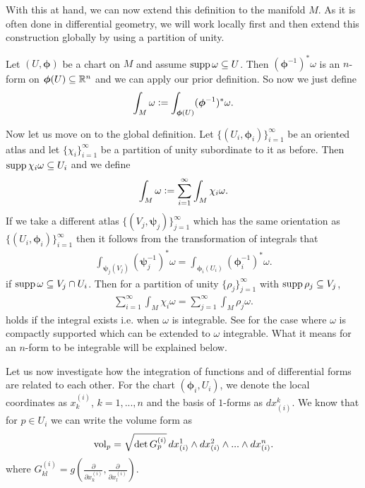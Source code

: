 \documentclass[../master_thesis.tex]{subfiles}
\begin{document}
With this at hand, we can now extend this definition to 
the manifold $M$. As it is often done in 
differential geometry, we will work locally first and then extend this 
construction globally by using a partition of unity.

Let $(U,\boldsymbol{\phi})$ be a chart on $M$ and assume $\operatorname{supp} \omega \subseteq U$. 
Then $(\boldsymbol{\phi}^{-1})^* \omega$
is an $n$-form on $\boldsymbol{\phi}(U) \subseteq \mathbb{R}^n$ and 
we can apply our prior definition. So now we just define 
\begin{align*}
    \int_M \omega \vcentcolon= \int_{\boldsymbol{\phi}(U)} (\boldsymbol{\phi}^{-1})^* \omega.
\end{align*}

Now let us move on to the global definition. Let $\{(U_i,\boldsymbol{\phi}_i)\}_{i=1}^\infty$
be an oriented atlas and let $\{ \chi_i \}_{i=1}^\infty$ be a partition 
of unity subordinate to it as before. 
Then $\operatorname{supp} \chi_i \omega \subseteq U_i$ 
and we define 
\begin{align*}
    \int_M \omega \vcentcolon= \sum_{i=1}^\infty \int_M \chi_i \omega.
\end{align*} 
If we take a different atlas $\{(V_j,\boldsymbol{\psi}_j)\}_{j=1}^\infty$
which has the same orientation as $\{(U_i,\boldsymbol{\phi}_i)\}_{i=1}^\infty$
then it follows from the transformation of integrals that 
\begin{align*}
    \int_{\boldsymbol{\psi}_j(V_j)} (\boldsymbol{\psi}_j^{-1})^* \omega
    = \int_{\boldsymbol{\phi}_i(U_i)} (\boldsymbol{\phi}_i^{-1})^* \omega.
\end{align*}
if $\operatorname{supp} \omega \subseteq V_j \cap U_i$. Then for a partition of unity 
$\{ \rho_j \}_{j=1}^\infty$ with $\operatorname{supp} \rho_j \subseteq V_j$,
\begin{align*}
    \sum_{i=1}^\infty \int_M \chi_i \omega = \sum_{j=1}^\infty \int_M \rho_j \omega.
\end{align*}
holds if the integral exists i.e. when $\omega$ is integrable. See \cite[Sec.\,V.3]{topology_and_geometry}
for the case where $\omega$ is compactly supported which can be extended 
to $\omega$ integrable.
What it means for an $n$-form to be integrable will be explained below.

Let us now investigate how the integration of functions and of 
differential forms are related to each other. 
For the chart $(\boldsymbol{\phi}_i, U_i)$, we denote the local coordinates as 
$x^{(i)}_k$, $k=1,...,n$ and the basis of $1$-forms as $dx_{(i)}^k$.
We know that for $p \in U_i$ we can write the volume form as
\begin{align*}
    \operatorname{vol}_p = \sqrt{ \det G_p^{(i)}} \,
        dx_{(i)}^1 \wedge dx_{(i)}^2 \wedge ... \wedge dx_{(i)}^n.
\end{align*}
where $G^{(i)}_{kl} = g(\frac{\partial}{\partial x^{(i)}_k},\frac{\partial}{\partial x^{(i)}_l} )$.
\end{document}

